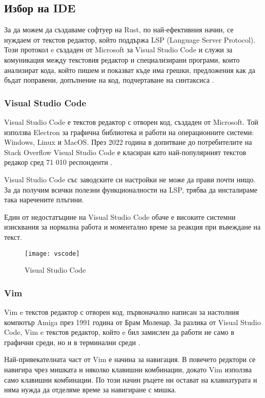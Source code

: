 \subsection{Избор на IDE}
За да можем да създаваме софтуер на Rust, по най-ефективния начин, се нуждаем от
текстов редактор, който поддържа LSP (Language Server Protocol). Този
протокол e създаден от Microsoft за Visual Studio Code и служи за комуникация
между текстовия редактор и специализирани програми, които анализират кода, който
пишем и показват къде има грешки, предложения как да бъдат поправени, допълнение
на код, подчертаване на синтаксиса \cite{lsp_wikipedia}.

\subsubsection{Visual Studio Code}
Visual Studio Code е текстов редактор с отворен код, създаден от Microsoft. Той
използва Electron за графична библиотека и работи на операционните системи: Windows, 
Linux и MacOS. През 2022 година в допитване до потребителите на Stack Overflow Visual
Studio Code е класиран като най-популярният текстов редакор сред 71 010 респонденти
\cite{vscode_wikipedia}.

Visual Studio Code със заводските си настройки не може да прави почти нищо. За
да получим всички полезни функционалности на LSP, трябва да инсталираме така
наречените плъгини.

Един от недостатъцине на Visual Studio Code обаче е високите системни изисквания за
нормална работа и моментално време за реакция при въвеждане на текст.
\begin{figure}[!htb]
  \texttt{[image: vscode]}
  \centering
  \caption{Visual Studio Code}
  \label{fig:vscode}
\end{figure}

\subsubsection{Vim}
Vim e текстов редактор с отворен код, първоначално написан за настолния компютър
Amiga през 1991 година от Брам Моленар. За разлика от Visual Studio Code, Vim e
текстов редактор, който e бил замислен да работи не само в графични среди, но и
в терминални среди \cite{vim_wikipedia}. 

Най-привекателната част от Vim е начина за навигация. В повечето редктори се
навигира чрез мишката и няколко клавишни комбинации, докато Vim използва само
клавишни комбинации. По този начин ръцете ни остават на клавиатурата и няма
нужда да отделяме време за навигиране с мишка. 

